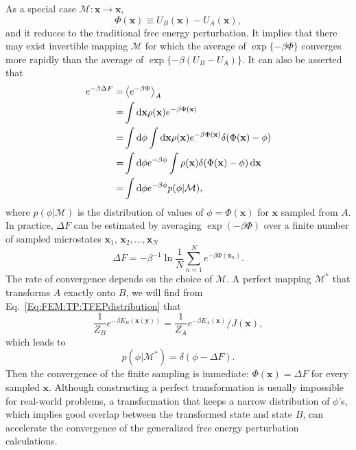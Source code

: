 As a special case $\mathcal{M}: \mathbf{x} \to\mathbf{x}$,
\begin{equation}
	\Phi(\mathbf{x})\equiv U_B(\mathbf{x})-U_A(\mathbf{x}),
\end{equation}
and it reduces to the traditional free energy perturbation. It implies that there may exist invertible mapping $\mathcal{M}$ for which the average of $\exp\{-\beta \Phi\}$ converges more rapidly than the average of $\exp\{-\beta (U_B-U_A)\}$. It can also be asserted that
\begin{align}
	e^{-\beta \Delta F}=&\left<e^{-\beta \Phi}\right>_A\notag\\
	                =&\int \mathop{}\!\mathrm{d} \mathbf{x} \rho(\mathbf{x})e^{-\beta \Phi(\mathbf{x})}\notag\\
	                =&\int \mathop{}\!\mathrm{d}\phi \int \mathop{}\!\mathrm{d} \mathbf{x} \rho(\mathbf{x})e^{-\beta \Phi(\mathbf{x})}\delta(\Phi(\mathbf{x})-\phi)\notag\\
	                =&\int \mathop{}\!\mathrm{d}\phi e^{-\beta \phi}\int \rho(\mathbf{x})\delta(\Phi(\mathbf{x})-\phi)\mathop{}\!\mathrm{d} \mathbf{x}\notag\\
	                =&\int \mathop{}\!\mathrm{d}\phi e^{-\beta \phi} p(\phi|\mathcal{M}),
\end{align}
where $p(\phi|\mathcal{M})$ is the distribution of values of $\phi=\Phi(\mathbf{x})$ for $\mathbf{x}$ sampled from $A$. In practice, $\Delta F$ can be estimated by averaging $\exp{(-\beta \Phi)}$ over a finite number of sampled microstates $\mathbf{x}_1,\,\mathbf{x}_2,\dots,\mathbf{x}_N$
\begin{equation}
	\Delta F=-\beta^{-1}\ln\frac{1}{N}\sum_{n=1}^N e^{-\beta \Phi(\mathbf{x}_n)}.
\end{equation}
The rate of convergence depends on the choice of $\mathcal{M}$. A perfect mapping $\mathcal{M}^\ast$ that transforms $A$ exactly onto $B$, we will find from Eq.~\ref{Eq:FEM:TP:TFEPdistribution} that
\begin{equation}
	\frac{1}{Z_B}e^{-\beta E_B(\mathbf{x}(\mathbf{y}))}=\frac{1}{Z_A}e^{-\beta E_A(\mathbf{x})}/J(\mathbf{x}),
\end{equation}
which leads to
\begin{equation}
	p(\phi|\mathcal{M}^\ast)=\delta (\phi-\Delta F).
\end{equation}
Then the convergence of the finite sampling is immediate: $\Phi(\mathbf{x})=\Delta F$ for every sampled $\mathbf{x}$. Although constructing a perfect transformation is usually impossible for real-world problems, a transformation that keeps a narrow distribution of $\phi$'s, which implies good overlap between the transformed state and state $B$, can accelerate the convergence of the generalized free energy perturbation calculations.

